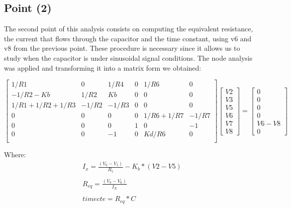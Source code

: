 \subsection{Point (2)} 

The second point of this analysis consists on computing the equivalent resistance, the current that flows through the capacitor and the time constant, using v6 and v8 from the previous point. 
These procedure is necessary since it allows us to study when the capacitor is under sinusoidal signal conditions.   
The node analysis was applied and transforming it into a matrix form we obtained:

$$
\begin{bmatrix} 
   1/R1           & 0       & 1/R4    & 0    & 1/R6         & 0       \\
  -1/R2-Kb        & 1/R2    & Kb      & 0    & 0            & 0       \\
   1/R1+1/R2+1/R3 & -1/R2   & -1/R3   & 0    & 0            & 0       \\
   0              & 0       & 0       & 0    & 1/R6 + 1/R7  & -1/R7   \\
   0              & 0       & 0       & 1    & 0            & -1      \\
   0              & 0       & -1      & 0    & Kd/R6        & 0       \\
\end {bmatrix} 
\begin{bmatrix}
V2 \\ V3 \\ V5 \\ V6 \\ V7 \\ V8
\end {bmatrix} 
=
\begin{bmatrix} 
0 \\ 0 \\ 0 \\ 0 \\ V6-V8 \\ 0
\end {bmatrix} 
$$ 

Where: 
\begin{align*} 
&I_x=\frac{(V_6-V_5)}{R_5} - K_b*(V2-V5)\\
\\    
&R_{eq}=\frac{(V_8-V_6)}{I_X}\\
\\
&timecte=R_{eq}*C\\
\end{align*}


